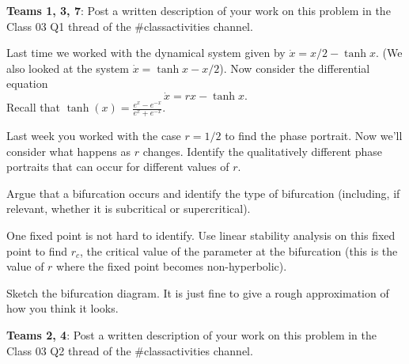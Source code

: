 \documentclass[12pt,letterpaper,noanswers]{exam}
\begin{document}
\begin{questions}
\noindent \textbf{Teams 1, 3, 7}: Post a written description of your work on this problem in the Class 03 Q1 thread of the \#classactivities channel. 



\item Last time we worked with the dynamical system given by $\dot{x} = x/2 - \tanh x$.  (We also looked at the system $\dot{x} = \tanh x - x/2$).  Now consider the differential equation
\[\dot{x} = r x - \tanh x.\]  Recall that $\tanh(x) = \frac{e^x-e^{-x}}{e^x+e^{-x}}.$
\begin{parts}
\item Last week you worked with the case $r=1/2$ to find the phase portrait.  Now we'll consider what happens as $r$ changes.  Identify the qualitatively different phase portraits that can occur for different values of $r$.
\item  Argue that a bifurcation occurs and identify the type of bifurcation (including, if relevant, whether
it is subcritical or supercritical).
\item One fixed point is not hard to identify.  Use linear stability analysis on this fixed point to find $r_c$, the critical value of the parameter at the bifurcation (this is the value of $r$ where the fixed point becomes non-hyperbolic).
\item Sketch the bifurcation diagram.  It is just fine to give a rough approximation of how you think it looks.

\noindent \textbf{Teams 2, 4}: Post a written description of your work on this problem in the Class 03 Q2 thread of the \#classactivities channel. 

\end{parts}
\end{questions}

\vfill
\end{document}
